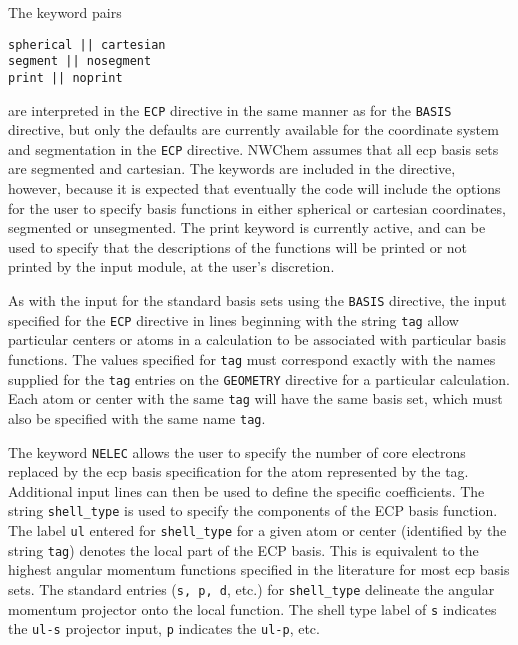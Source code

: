 The keyword pairs

\begin{verbatim}
spherical || cartesian
segment || nosegment
print || noprint
\end{verbatim}

are interpreted
in the \verb+ECP+ directive in the same manner as for the \verb+BASIS+
directive, but only the defaults are currently available for
the coordinate system and segmentation in the \verb+ECP+ directive.   
NWChem assumes
that all ecp basis sets are segmented and cartesian.  
The keywords are included in the directive, however, because it is
expected that eventually the code will include the options for the
user to specify basis functions in either spherical or 
cartesian coordinates, segmented or unsegmented.  The print keyword is
currently active, and can be used to specify that the descriptions of
the functions will be printed or not printed by the input module, at the user's
discretion.  

As with the input for the standard basis sets using the \verb+BASIS+
directive, the input specified for the \verb+ECP+ directive in lines 
beginning with the string \verb+tag+
allow particular centers or atoms in a calculation to be associated with
particular basis functions.  The values specified for \verb+tag+
must correspond exactly with the names supplied for the \verb+tag+ entries
on the \verb+GEOMETRY+ directive for a particular calculation.  Each atom
or center with the same \verb+tag+ will have the same basis set, which must
also be specified with the same name \verb+tag+.

The keyword \verb+NELEC+ allows the user to specify the number of core 
electrons replaced by
the ecp basis specification for the atom represented by the tag.  Additional
input lines can then be used to define the specific coefficients.
The string \verb+shell_type+ is used to specify the components of the
ECP basis function.  The label \verb+ul+ entered for \verb+shell_type+
for a given atom or center (identified by the string \verb+tag+) denotes
the local part of the ECP basis.  This is equivalent to the highest 
angular momentum
functions specified in the literature for most ecp basis sets.  The
standard entries (\verb+s, p, d+, etc.) for \verb+shell_type+ delineate 
the angular momentum projector onto the local function.  The shell type 
label of \verb+s+ indicates the \verb+ul-s+ projector input, \verb+p+ 
indicates the \verb+ul-p+, etc.

